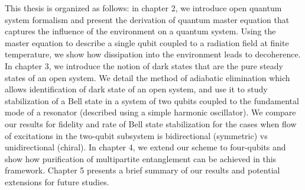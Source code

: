 This thesis is organized as follows: in chapter 2, we introduce open quantum system formalism and present the derivation of quantum master equation that captures the influence of the environment on a quantum system. Using the master equation to describe a single qubit coupled to a radiation field at finite temperature, we show how dissipation into the environment leads to decoherence. In chapter 3, we introduce the notion of dark states that are the pure steady states of an open system. We detail the method of adiabatic elimination which allows identification of dark state of an open system, and use it to study stabilization of a Bell state in a system of two qubits coupled to the fundamental mode of a resonator (described using  a simple harmonic oscillator). We compare our results for fidelity and rate of Bell state stabilization for the cases when flow of excitations in the two-qubit subsystem is bidirectional (symmetric) vs unidirectional (chiral). In chapter 4, we extend our scheme to four-qubits and show how purification of multipartite entanglement can be achieved in this framework. Chapter 5 presents a brief summary of our results and potential extensions for future studies.





